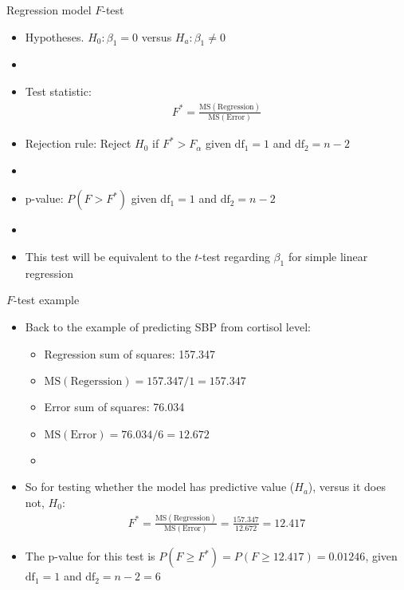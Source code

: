 \documentclass[xcolor=dvipsnames]{beamer}
\begin{document}
\begin{frame}{Regression model $F$-test}
	\begin{itemize}
		\item Hypotheses. $H_0: \beta_1 = 0$ versus $H_a: \beta_1 \neq 0$ \pause
		\item[]
		\item Test statistic: \pause
		\begin{gather*}
		F^*= \frac{\text{MS}(\text{Regression})}{\text{MS}(\text{Error})}
		\end{gather*} \pause
		\item Rejection rule: Reject $H_0$ if $F^*> F_{\alpha}$ given $\text{df}_1=1$ and $\text{df}_2=n-2$ \pause
		\item[]
		\item p-value: $P(F > F^*)$ given $\text{df}_1=1$ and $\text{df}_2=n-2$ \pause
		\item[]
		\item This test will be equivalent to the $t$-test regarding $\beta_1$ for simple linear regression
	\end{itemize}
\end{frame}

\begin{frame}{$F$-test example}
	\begin{itemize}
		\item Back to the example of predicting SBP from cortisol level: \pause
		\begin{itemize}
			\item Regression sum of squares: 157.347 \pause
			\item $\text{MS}(\text{Regerssion}) = 157.347 / 1 = 157.347$ \pause
			\item Error sum of squares: 76.034 \pause
			\item $\text{MS}(\text{Error}) = 76.034 / 6 = 12.672$ \pause
			\item[]
		\end{itemize}
		\item So for testing whether the model has predictive value ($H_a$), versus it does not, $H_0$: \pause
		\begin{gather*}
			F^*= \frac{\text{MS}(\text{Regression})}{\text{MS}(\text{Error})} = \frac{157.347}{12.672} = 12.417
		\end{gather*} \pause
		\item The p-value for this test is $P(F \geq F^*) = P(F \geq 12.417) = 0.01246$,  given $\text{df}_1=1$ and $\text{df}_2=n-2 = 6$
	\end{itemize}
\end{frame}
\end{document}
